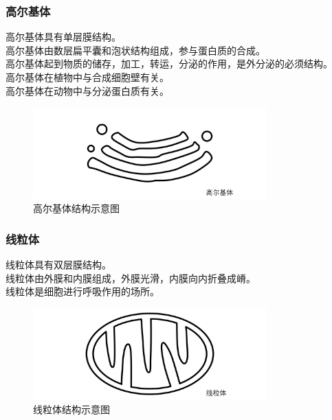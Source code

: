 \documentclass[UTF8]{ctexart}
\begin{document}
\subsubsection{高尔基体}
    高尔基体具有单层膜结构。\\[3mm]
    高尔基体由数层扁平囊和泡状结构组成，参与蛋白质的合成。\\[3mm]
    高尔基体起到物质的储存，加工，转运，分泌的作用，是外分泌的必须结构。\\[3mm]
    高尔基体在植物中与合成细胞壁有关。\\[3mm]
    高尔基体在动物中与分泌蛋白质有关。
    \begin{figure}[h]
        \begin{center}
            \includegraphics[width=9cm]{BiologyImage/5.jpg}
            \caption{高尔基体结构示意图}
        \end{center}
    \end{figure}
    
\newpage
    
\subsubsection{线粒体}
    线粒体具有双层膜结构。\\[3mm]
    线粒体由外膜和内膜组成，外膜光滑，内膜向内折叠成嵴。\\[3mm]
    线粒体是细胞进行呼吸作用的场所。
    \begin{figure}[h]
        \begin{center}
            \includegraphics[width=9cm]{BiologyImage/7.jpg}
            \caption{线粒体结构示意图}
        \end{center}
    \end{figure}
\end{document}
